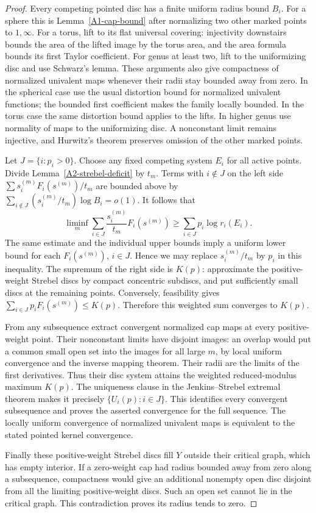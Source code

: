 \begin{proof}
Every competing pointed disc has a finite uniform radius bound $B_i$.
For a sphere this is Lemma~\ref{A1-cap-bound} after normalizing two
other marked points to $1,\infty$. For a torus, lift to its flat
universal covering: injectivity downstairs bounds the area of the
lifted image by the torus area, and the area formula bounds its first
Taylor coefficient. For genus at least two, lift to the uniformizing
disc and use Schwarz's lemma. These arguments also give compactness
of normalized univalent maps whenever their radii stay bounded away
from zero. In the spherical case use the usual distortion bound for
normalized univalent functions; the bounded first coefficient makes
the family locally bounded. In the torus case the same distortion
bound applies to the lifts. In higher genus use normality of maps to
the uniformizing disc. A nonconstant limit remains injective, and
Hurwitz's theorem preserves omission of the other marked points.

Let $J=\{i:p_i>0\}$. Choose any fixed competing system $E_i$ for all
active points. Divide Lemma~\ref{A2-strebel-deficit} by $t_m$. Terms
with $i\notin J$ on the left side $\sum s_i^{(m)}F_i(s^{(m)})/t_m$
are bounded above by $\sum_{i\notin J}(s_i^{(m)}/t_m)\log B_i=o(1)$.
It follows that
\[
 \liminf_m\sum_{i\in J}\frac{s_i^{(m)}}{t_m}F_i(s^{(m)})
 \geq\sum_{i\in J}p_i\log r_i(E_i).
\]
The same estimate and the individual upper bounds imply a uniform
lower bound for each $F_i(s^{(m)})$, $i\in J$. Hence we may replace
$s_i^{(m)}/t_m$ by $p_i$ in this inequality. The supremum of the right
side is $K(p)$: approximate the positive-weight Strebel discs by compact
concentric subdiscs, and put sufficiently small discs at the remaining
points. Conversely, feasibility gives
$\sum_{i\in J}p_iF_i(s^{(m)})\leq K(p)$. Therefore this weighted sum
converges to $K(p)$.

From any subsequence extract convergent normalized cap maps at every
positive-weight point. Their nonconstant limits have disjoint images:
an overlap would put a common small open set into the images for all
large $m$, by local uniform convergence and the inverse mapping theorem.
Their radii are the limits of the first derivatives. Thus their disc
system attains the weighted reduced-modulus maximum $K(p)$.
The uniqueness clause in the Jenkins--Strebel extremal theorem makes
it precisely $\{U_i(p):i\in J\}$. This identifies every convergent
subsequence and proves the asserted convergence for the full sequence.
The locally uniform convergence of normalized univalent maps is
equivalent to the stated pointed kernel convergence.

Finally these positive-weight Strebel discs fill $Y$ outside their
critical graph, which has empty interior. If a zero-weight cap had
radius bounded away from zero along a subsequence, compactness would
give an additional nonempty open disc disjoint from all the limiting
positive-weight discs. Such an open set cannot lie in the critical
graph. This contradiction proves its radius tends to zero.
\end{proof}

